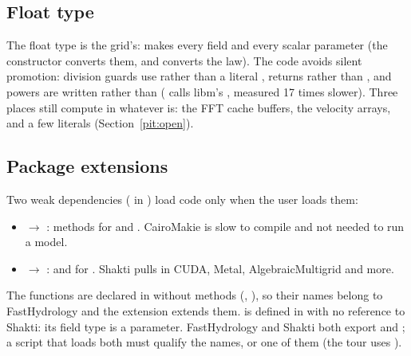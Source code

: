\subsection{Float type}\label{arch:float}
The float type is the grid's:  makes every field and every scalar parameter
 (the constructor converts them, and  converts the law). The code avoids
silent promotion: division guards use  rather than a literal ,  returns
 rather than , and powers are written  rather than 
( calls libm's , measured 17 times slower). Three places still compute in
 whatever  is: the FFT cache buffers, the  velocity arrays, and a few
 literals (Section~\ref{pit:open}).

\subsection{Package extensions}\label{arch:ext}
Two weak dependencies (\code{[weakdeps]} in ) load code only when the user loads them:
\begin{itemize}[leftmargin=1.5em]
\item {} $\to$ : methods for  and
  . CairoMakie is slow to compile and not needed to run a model.
\item {} $\to$ :  and  for
  . Shakti pulls in CUDA, Metal, AlgebraicMultigrid and more.
\end{itemize}
The functions are declared in  without methods (, ),
so their names belong to FastHydrology and the extension extends them.  is defined in
 with no reference to Shakti: its field type is a parameter. FastHydrology and Shakti both
export  and ; a script that loads both must qualify the names, or  one of them (the tour
uses ).

